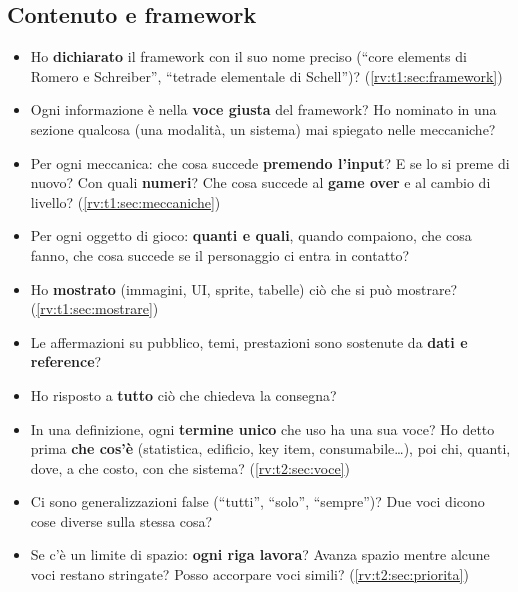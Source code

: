 \subsection{Contenuto e framework}
\begin{itemize}
  \item Ho \textbf{dichiarato} il framework con il suo nome preciso (``core
        elements di Romero e Schreiber'', ``tetrade elementale di
        Schell'')? (\ref{rv:t1:sec:framework})
  \item Ogni informazione è nella \textbf{voce giusta} del framework? Ho
        nominato in una sezione qualcosa (una modalità, un sistema) mai
        spiegato nelle meccaniche?
  \item Per ogni meccanica: che cosa succede \textbf{premendo l'input}? E
        se lo si preme di nuovo? Con quali \textbf{numeri}? Che cosa succede
        al \textbf{game over} e al cambio di livello?
        (\ref{rv:t1:sec:meccaniche})
  \item Per ogni oggetto di gioco: \textbf{quanti e quali}, quando
        compaiono, che cosa fanno, che cosa succede se il personaggio ci
        entra in contatto?
  \item Ho \textbf{mostrato} (immagini, UI, sprite, tabelle) ciò che si può
        mostrare? (\ref{rv:t1:sec:mostrare})
  \item Le affermazioni su pubblico, temi, prestazioni sono sostenute da
        \textbf{dati e reference}?
  \item Ho risposto a \textbf{tutto} ciò che chiedeva la consegna?
  \item In una definizione, ogni \textbf{termine unico} che uso ha una sua
        voce? Ho detto prima \textbf{che cos'è} (statistica, edificio, key
        item, consumabile\dots), poi chi, quanti, dove, a che costo, con che
        sistema? (\ref{rv:t2:sec:voce})
  \item Ci sono generalizzazioni false (``tutti'', ``solo'', ``sempre'')?
        Due voci dicono cose diverse sulla stessa cosa?
  \item Se c'è un limite di spazio: \textbf{ogni riga lavora}? Avanza spazio
        mentre alcune voci restano stringate? Posso accorpare voci simili?
        (\ref{rv:t2:sec:priorita})
\end{itemize}

